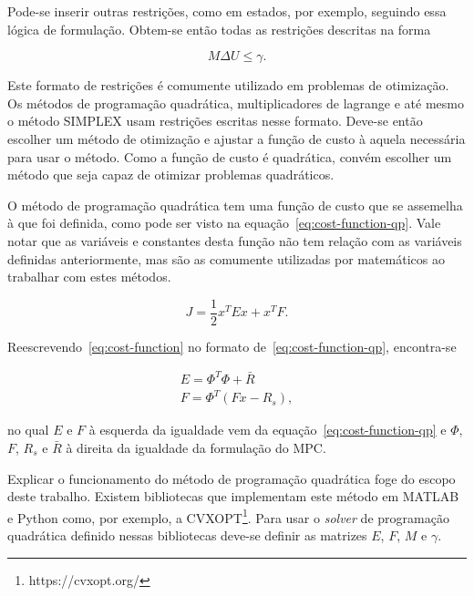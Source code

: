 Pode-se inserir outras restrições, como em estados, por exemplo, seguindo essa
lógica de formulação. Obtem-se então todas as restrições descritas na forma

\begin{equation}
	\label{eq:generic-restriction-formulation}
	M\Delta{}U \le \gamma.
\end{equation}

Este formato de restrições é comumente utilizado em problemas de otimização. Os
métodos de programação quadrática, multiplicadores de lagrange e até mesmo o
método SIMPLEX usam restrições escritas nesse formato. Deve-se então escolher um
método de otimização e ajustar a função de custo à aquela necessária para usar o
método. Como a função de custo é quadrática, convém escolher um método que seja
capaz de otimizar problemas quadráticos.

O método de programação quadrática tem uma função de custo que se assemelha à
que foi definida, como pode ser visto na equação~\eqref{eq:cost-function-qp}.
Vale notar que as variáveis e constantes desta função não tem relação com as
variáveis definidas anteriormente, mas são as comumente utilizadas por
matemáticos ao trabalhar com estes métodos.

\begin{equation}
	\label{eq:cost-function-qp}
	J = \frac{1}{2} x^T Ex + x^T F.
\end{equation}

Reescrevendo~\eqref{eq:cost-function} no formato de~\eqref{eq:cost-function-qp},
encontra-se

\begin{equation}
	\label{eq:cost-function-qp-constants}
	\begin{split}
		E = \Phi^T \Phi + \bar{R} \\
		F = \Phi^T (Fx - R_s),
	\end{split}
\end{equation}

no qual \( E \) e \( F \) à esquerda da igualdade vem da
equação~\eqref{eq:cost-function-qp} e \( \Phi \), \( F \), \( R_s \) e \(\bar{R}
\) à direita da igualdade da formulação do \ac{MPC}.

Explicar o funcionamento do método de programação quadrática foge do escopo
deste trabalho. Existem bibliotecas que implementam este método em MATLAB e
Python como, por exemplo, a CVXOPT\footnote{https://cvxopt.org/}. Para usar o
\textit{solver} de programação quadrática definido nessas bibliotecas deve-se
definir as matrizes \( E \), \( F \), \( M \) e \( \gamma \).

